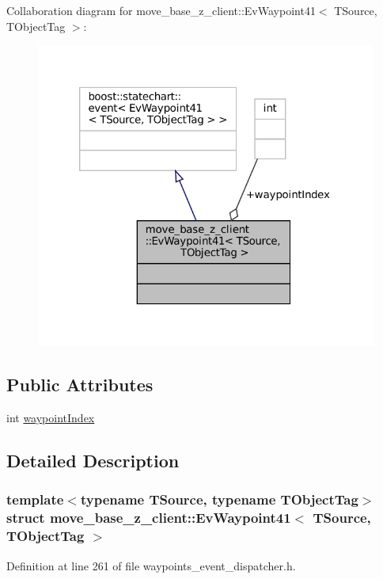Collaboration diagram for move\+\_\+base\+\_\+z\+\_\+client\+:\+:Ev\+Waypoint41$<$ T\+Source, T\+Object\+Tag $>$\+:
\nopagebreak
\begin{figure}[H]
\begin{center}
\leavevmode
\includegraphics[width=320pt]{structmove__base__z__client_1_1EvWaypoint41__coll__graph}
\end{center}
\end{figure}
\subsection*{Public Attributes}
\begin{DoxyCompactItemize}
\item 
int \hyperlink{structmove__base__z__client_1_1EvWaypoint41_aad92d0cca43e0daf057fa3c0ee79cdd7}{waypoint\+Index}
\end{DoxyCompactItemize}


\subsection{Detailed Description}
\subsubsection*{template$<$typename T\+Source, typename T\+Object\+Tag$>$\newline
struct move\+\_\+base\+\_\+z\+\_\+client\+::\+Ev\+Waypoint41$<$ T\+Source, T\+Object\+Tag $>$}



Definition at line 261 of file waypoints\+\_\+event\+\_\+dispatcher.\+h.




